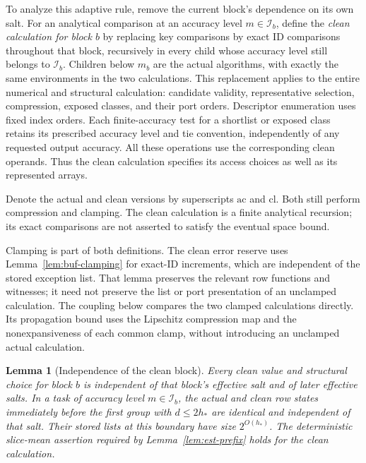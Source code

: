 \documentclass[11pt]{article}
\numberwithin{equation}{section}
\newtheorem{lemma}[theorem]{Lemma}
\theoremstyle{definition}
\theoremstyle{remark}
\begin{document}
To analyze this adaptive rule, remove the current block's dependence on its own salt. For an analytical comparison at an accuracy level ${m}\in\mathcal I_b$, define the
\emph{clean calculation for block $b$} by replacing key comparisons by
exact ID comparisons throughout that block, recursively in every child
whose accuracy level still belongs to $\mathcal I_b$.  Children below ${m}_b$ are
the actual algorithms, with exactly the same environments in the two
calculations.  This replacement applies to the entire numerical and
structural calculation: candidate validity, representative selection,
compression, exposed classes, and their port orders.  Descriptor
enumeration uses fixed index orders.  Each finite-accuracy test for a
shortlist or exposed class retains its prescribed accuracy level and
tie convention, independently of any requested output accuracy.  All
these operations use the corresponding clean operands.  Thus the clean
calculation specifies its access choices as well as its represented
arrays.

Denote the actual and clean versions by superscripts $\mathrm{ac}$ and
$\mathrm{cl}$.  Both still perform compression and clamping.  The clean
calculation is a finite analytical recursion; its exact comparisons are
not asserted to satisfy the eventual space bound.

Clamping is part of both definitions.  The clean error reserve uses
Lemma~\ref{lem:buf-clamping} for exact-ID increments, which are
independent of the stored exception list.  That lemma preserves the
relevant row functions and witnesses; it need not preserve the list or
port presentation of an unclamped calculation.  The coupling below
compares the two clamped calculations directly.  Its propagation bound
uses the Lipschitz compression map and the nonexpansiveness of each
common clamp, without introducing an unclamped actual calculation.

\begin{lemma}[Independence of the clean block]\label{lem:fp-clean}
Every clean value and structural choice for block $b$ is independent of
that block's effective salt and of later effective salts.  In a task of
accuracy level ${m}\in\mathcal I_b$, the actual and clean row states immediately before
the first group with $d\le2h_*$ are identical and independent of that
salt.  Their stored lists at this boundary have size $2^{O(h_*)}$.
The deterministic slice-mean assertion required by
Lemma~\ref{lem:est-prefix} holds for the clean calculation.
\end{lemma}
\end{document}
